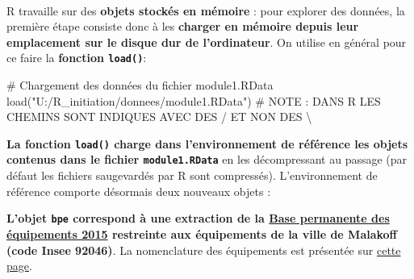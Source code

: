 \documentclass[12pt,twosided, notitlepage]{book}
\newenvironment{Shaded}{}{}
\newcommand{\KeywordTok}[1]{\textcolor[rgb]{0.00,0.00,1.00}{{#1}}}
\newcommand{\StringTok}[1]{\textcolor[rgb]{0.00,0.50,0.50}{{#1}}}
\newcommand{\CommentTok}[1]{\textcolor[rgb]{0.00,0.50,0.00}{{#1}}}
\newcommand{\NormalTok}[1]{{#1}}
\renewenvironment{Shaded}{\begin{snugshade}}{\end{snugshade}}
\begin{document}
~

R travaille sur des \textbf{objets stockés en mémoire} : pour explorer
des données, la première étape consiste donc à les \textbf{charger en
mémoire depuis leur emplacement sur le disque dur de l'ordinateur}. On
utilise en général pour ce faire la \textbf{fonction
\texttt{load()}}:

\begin{Shaded}
\begin{Highlighting}[]
\CommentTok{# Chargement des données du fichier module1.RData}
\KeywordTok{load}\NormalTok{(}\StringTok{"U:/R_initiation/donnees/module1.RData"}\NormalTok{)}
\CommentTok{# NOTE : DANS R LES CHEMINS SONT INDIQUES AVEC DES / ET NON DES \textbackslash{}}
\end{Highlighting}
\end{Shaded}

\textbf{La fonction \texttt{load()} charge dans l'environnement de
référence les objets contenus dans le fichier \texttt{module1.RData}} en
les décompressant au passage (par défaut les fichiers saugevardés par R
sont compressés). L'environnement de référence comporte désormais deux
nouveaux objets :

\begin{Shaded}
\end{Shaded}

\textbf{L'objet \texttt{bpe} correspond à une extraction de la
\href{https://www.insee.fr/fr/statistiques/2410933}{Base permanente des
équipements 2015} restreinte aux équipements de la ville de Malakoff
(code Insee 92046)}. La nomenclature des équipements est présentée sur
\href{https://www.insee.fr/fr/statistiques/2578377}{cette page}.
\end{document}
